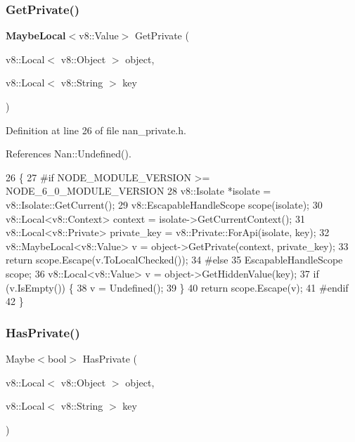 \subsubsection{Get\+Private()}
{\footnotesize\ttfamily \textbf{ Maybe\+Local}$<$v8\+::\+Value$>$ Get\+Private (\begin{DoxyParamCaption}\item[{v8\+::\+Local$<$ v8\+::\+Object $>$}]{object,  }\item[{v8\+::\+Local$<$ v8\+::\+String $>$}]{key }\end{DoxyParamCaption})}



Definition at line 26 of file nan\+\_\+private.\+h.



References Nan\+::\+Undefined().


\begin{DoxyCode}
26                                                             \{
27 \textcolor{preprocessor}{#if NODE\_MODULE\_VERSION >= NODE\_6\_0\_MODULE\_VERSION}
28   v8::Isolate *isolate = v8::Isolate::GetCurrent();
29   v8::EscapableHandleScope scope(isolate);
30   v8::Local<v8::Context> context = isolate->GetCurrentContext();
31   v8::Local<v8::Private> private\_key = v8::Private::ForApi(isolate, key);
32   v8::MaybeLocal<v8::Value> v = \textcolor{keywordtype}{object}->GetPrivate(context, private\_key);
33   \textcolor{keywordflow}{return} scope.Escape(v.ToLocalChecked());
34 \textcolor{preprocessor}{#else}
35   EscapableHandleScope scope;
36   v8::Local<v8::Value> v = \textcolor{keywordtype}{object}->GetHiddenValue(key);
37   \textcolor{keywordflow}{if} (v.IsEmpty()) \{
38     v = Undefined();
39   \}
40   \textcolor{keywordflow}{return} scope.Escape(v);
41 \textcolor{preprocessor}{#endif}
42 \}
\end{DoxyCode}
\mbox{\label{nan__private_8h_a960427fdf329ee6469b302524c94a89f}} 
\subsubsection{Has\+Private()}
{\footnotesize\ttfamily Maybe$<$bool$>$ Has\+Private (\begin{DoxyParamCaption}\item[{v8\+::\+Local$<$ v8\+::\+Object $>$}]{object,  }\item[{v8\+::\+Local$<$ v8\+::\+String $>$}]{key }\end{DoxyParamCaption})}



